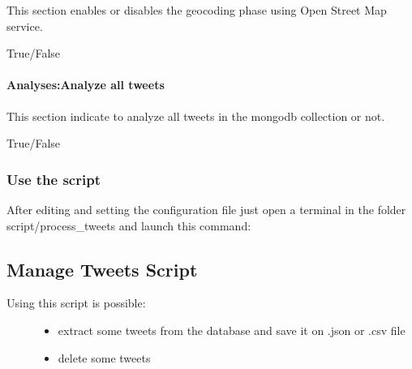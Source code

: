 \documentclass[letterpaper,10pt,english]{sphinxmanual}
\begin{document}
\begin{DUlineblock}{0em}
\item[] This section enables or disables the geocoding phase using Open Street Map service.
\item[]  True/False
\end{DUlineblock}


\paragraph{Analyses:Analyze all tweets}
\label{\detokenize{guide/tweet_processor_guide:analyses-analyze-all-tweets}}
\begin{sphinxVerbatim}[commandchars=\\\{\}]
 
\end{sphinxVerbatim}

\begin{DUlineblock}{0em}
\item[] This section indicate to analyze all tweets in the mongodb collection or not.
\item[]  True/False
\end{DUlineblock}


\subsubsection{Use the script}
\label{\detokenize{guide/tweet_processor_guide:use-the-script}}
\sphinxAtStartPar
After editing and setting the configuration file just open a terminal in the folder script/process\_tweets and launch this command:

\begin{sphinxVerbatim}[commandchars=\\\{\}]
 
\end{sphinxVerbatim}


\subsection{Manage Tweets Script}
\label{\detokenize{guide/manage_tweets_guide:manage-tweets-script}}\label{\detokenize{guide/manage_tweets_guide::doc}}\begin{description}
\item[{Using this script is possible:}] \leavevmode\begin{itemize}
\item {} 
\sphinxAtStartPar
extract some tweets from the database and save it on .json or .csv file

\item {} 
\sphinxAtStartPar
delete some tweets

\end{itemize}

\end{description}
\end{document}
